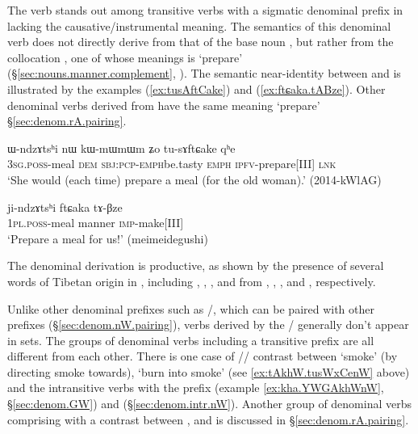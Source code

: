 The verb  stands out among transitive verbs with  a sigmatic denominal prefix in lacking the causative/instrumental meaning. The semantics of this denominal verb does not directly derive from that of the base noun , but rather from the collocation , one of whose meanings is `prepare' (§\ref{sec:nouns.manner.complement}, \citealt[240]{jacques16complementation}). The semantic near-identity between  and  is illustrated by the examples (\ref{ex:tusAftCake}) and (\ref{ex:ftɕaka.tABze}). Other denominal verbs derived from  have the same meaning `prepare'  §\ref{sec:denom.rA.pairing}.


\begin{exe}
\ex \label{ex:tusAftCake}
 \gll ɯ-ndzɤtsʰi nɯ kɯ-mɯ\redp{}mɯm ʑo tu-sɤftɕake qʰe \\
 \textsc{3sg}.\textsc{poss}-meal \textsc{dem} \textsc{sbj}:\textsc{pcp}-\textsc{emph}\redp{}be.tasty \textsc{emph} \textsc{ipfv}-prepare[III] \textsc{lnk} \\
 \glt `She would (each time) prepare a meal (for the old woman).' (2014-kWlAG)
\end{exe}
 
 \begin{exe}
\ex \label{ex:ftɕaka.tABze}
 \gll  ji-ndzɤtsʰi ftɕaka tɤ-βze \\
 \textsc{1pl}.\textsc{poss}-meal manner \textsc{imp}-make[III] \\
 \glt  `Prepare a meal for us!' (meimeidegushi)
\end{exe}

The   denominal derivation is productive, as shown by the presence of several words of Tibetan origin in , including , , ,  and   from , , ,  and , respectively.
  
Unlike other denominal prefixes such as /, which can be paired with other prefixes (§\ref{sec:denom.nW.pairing}), verbs derived by the / generally don't appear in sets. The groups of denominal verbs including a transitive  prefix are all different from each other. There is one case of // contrast between  `smoke' (by directing smoke towards), `burn into smoke' (see \ref{ex:tAkhW.tusWxCenW} above) and the intransitive verbs  with the  prefix (example \ref{ex:kha.YWGAkhWnW}, §\ref{sec:denom.GW}) and  (§\ref{sec:denom.intr.nW}). Another group of denominal verbs comprising  with a contrast between ,  and  is discussed in §\ref{sec:denom.rA.pairing}.


